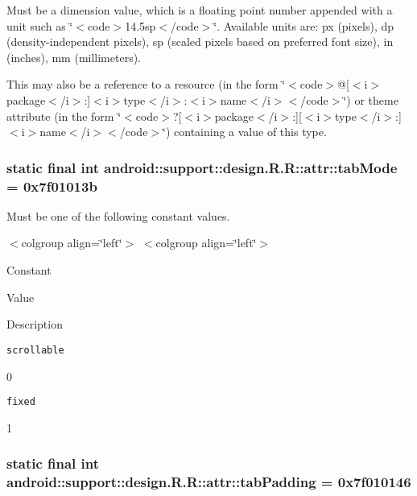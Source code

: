 Must be a dimension value, which is a floating point number appended with a unit such as \char`\"{}$<$code$>$14.5sp$<$/code$>$\char`\"{}. Available units are: px (pixels), dp (density-independent pixels), sp (scaled pixels based on preferred font size), in (inches), mm (millimeters). 

This may also be a reference to a resource (in the form \char`\"{}$<$code$>$@\mbox{[}$<$i$>$package$<$/i$>$:\mbox{]}$<$i$>$type$<$/i$>$:$<$i$>$name$<$/i$>$$<$/code$>$\char`\"{}) or theme attribute (in the form \char`\"{}$<$code$>$?\mbox{[}$<$i$>$package$<$/i$>$:\mbox{]}\mbox{[}$<$i$>$type$<$/i$>$:\mbox{]}$<$i$>$name$<$/i$>$$<$/code$>$\char`\"{}) containing a value of this type. \hypertarget{classandroid_1_1support_1_1design_1_1_r_1_1attr_5ee5095aaba72e65338420e6829dbf07}{
\subsubsection[{tabMode}]{\setlength{\rightskip}{0pt plus 5cm}static final int android::support::design.R.R::attr::tabMode = 0x7f01013b}}
\label{classandroid_1_1support_1_1design_1_1_r_1_1attr_5ee5095aaba72e65338420e6829dbf07}


Must be one of the following constant values. \begin{TabularC}{0}
\hline
\end{TabularC}
$<$colgroup align=\char`\"{}left\char`\"{}$>$ $<$colgroup align=\char`\"{}left\char`\"{}$>$ 

Constant

Value

Description 

{\tt scrollable}

0

{\tt fixed}

1\hypertarget{classandroid_1_1support_1_1design_1_1_r_1_1attr_c670b35d5d32f917a815eedb5fee3c53}{
\subsubsection[{tabPadding}]{\setlength{\rightskip}{0pt plus 5cm}static final int android::support::design.R.R::attr::tabPadding = 0x7f010146}}
\label{classandroid_1_1support_1_1design_1_1_r_1_1attr_c670b35d5d32f917a815eedb5fee3c53}


